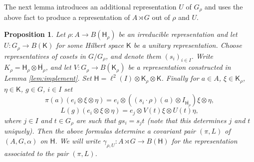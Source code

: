 \documentclass[11 pt, leqno, hidelinks]{amsart}%
\theoremstyle{plain}
\newtheorem{proposition}[theorem]{Proposition}
\numberwithin{equation}{section}
\newcommand{\Hil}{\mathsf{H}}
\newcommand{\Kil}{\mathsf{K}}
\begin{document}
The next lemma introduces an additional representation $U$ of $G_\rho$ and uses the above fact to produce a representation of $A \rtimes G$ out of $\rho$ and $U$.

\begin{proposition} \label{prop:repconstruction}
	Let $\rho:A \to B(\Hil_\rho)$ be an irreducible representation and let $U:G_\rho \to B(\Kil)$ for some Hilbert space $\Kil$	be a unitary representation. Choose representatives  of cosets in $G/G_\rho$, and denote them $(s_i)_{i \in I}$. Write $K_\rho= \Hil_\rho \otimes \overline{\Hil_\rho}$, and let $V:G_\rho \to B(\Kil_\rho)$ be a representation constructed in Lemma \ref{lem:implement}. Set $\Hil = \ell^2(I) \otimes \Kil_\rho \otimes \Kil$. Finally for $a \in A$, $\xi \in \Kil_\rho$, $\eta \in \Kil$, $g \in G$, $i \in I$ set
	\[ \pi(a) (e_i \otimes \xi \otimes \eta) = e_i \otimes ((s_i \cdot \rho)(a) \otimes I_{\overline{\Hil_\rho}}) \xi \otimes \eta,\]
	\[ L(g) (e_i \otimes \xi\otimes \eta) = e_j \otimes V(t) \xi  \otimes U(t) \eta,\]
	where $j\in I$ and $t \in G_\rho$ are such that $gs_i = s_jt$ (note that this determines $j$ and $t$ uniquely).
	Then the above formulas determine a covariant pair $(\pi, L)$ of $(A, G, \alpha)$ on $\Hil$. We will write $\gamma_{\rho,U}:A \rtimes G \to B(\Hil)$ for the representation associated to the pair $(\pi, L)$.
\end{proposition}
\end{document}
